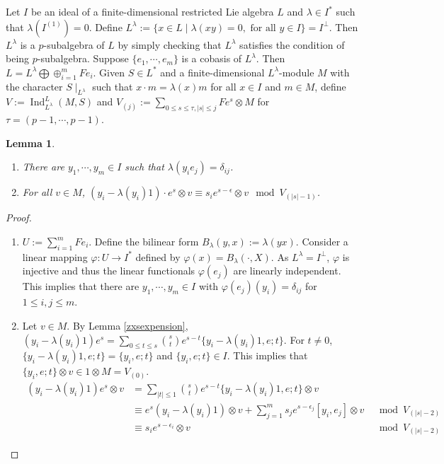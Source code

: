 \documentclass[12pt,MSc]{muthesis_2023}
\theoremstyle{plain}%
\newtheorem{Lemma}[FactCounter]{Lemma} %
\theoremstyle{definition}
\theoremstyle{remark}
\DeclareMathOperator{\Ind}{Ind}
\begin{document}
Let $I$ be an ideal of a finite-dimensional restricted Lie algebra $L$ and $\lambda\in I^*$ such that $\lambda(I^{(1)})=0$. Define $L^{\lambda}:= \{x\in L \mid \lambda(xy)=0, \text{ for all } y\in I\}=I^{\perp}$. Then $L^{\lambda}$ is a $p$-subalgebra of $L$ by simply checking that $L^{\lambda}$ satisfies the condition of being $p$-subalgebra. Suppose $\{e_1,\cdots, e_m\}$ is a cobasis of $L^{\lambda}$. Then $L=L^{\lambda}\bigoplus \oplus_{i=1}^m Fe_i$. Given $S\in L^*$ and a finite-dimensional $L^{\lambda}$-module $M$ with the character $S\mid_{L^{\lambda}}$ such that $x\cdot m= \lambda(x)m$ for all $x\in I$ and $m\in M$, define $V:=\Ind^L_{L^{\lambda}}(M,S)$ and $V_{(j)}:=\sum_{0\leq s\leq \tau, |s|\leq j}Fe^s \otimes M$ for $\tau=(p-1, \cdots, p-1)$.

\begin{Lemma}\label{equationaboutyes}
\begin{enumerate}
\item[(1)]
There are $y_1,\cdots, y_m \in I$ such that $\lambda(y_ie_j)=\delta_{ij}$.

\item[(2)] For all $v\in M$, $(y_i-\lambda(y_i)1)\cdot e^s\otimes v \equiv s_i e^{s-\epsilon}\otimes v \mod V_{(|s|-1)}$.
\end{enumerate}
\end{Lemma}

\begin{proof}
\begin{enumerate}
\item[(1)] $U:=\sum_{i=1}^m Fe_i$. Define the bilinear form $B_{\lambda}(y,x):= \lambda(yx)$. Consider a linear mapping $\varphi: U \rightarrow I^*$ defined by $\varphi(x)=B_{\lambda}(\cdot, X)$. As $L^{\lambda}=I^{\perp}$, $\varphi$ is injective and thus the linear functionals $\varphi(e_j)$ are linearly independent. This implies that there are $y_1,\cdots, y_m\in I$ with $\varphi(e_j)(y_i)=\delta_{ij}$ for $1\leq i,j \leq m$.

\item[(2)]
Let $v\in M$. By Lemma \ref{zxsexpension}, $(y_i-\lambda(y_i)1)e^s=\sum_{0\leq t\leq s}\binom{s}{t}e^{s-t}\{y_i-\lambda(y_i)1, e; t\}$. For $t\neq 0$, $\{y_i-\lambda(y_i)1, e;t\}=\{y_i, e;t\}$ and $\{y_i, e;t\}\in I$. This implies that $\{y_i, e ; t\}\otimes v \in 1\otimes M=V_{(0)}$. 
\begin{align*}
(y_i-\lambda(y_i)1)e^s\otimes v&=\sum_{|t|\leq 1}\binom{s}{t}e^{s-t}\{y_i-\lambda(y_i)1, e; t\}\otimes v&\\
&\equiv e^s(y_i-\lambda(y_i)1)\otimes v+\sum_{j=1}^m s_je^{s-\epsilon_j}[y_i, e_j]\otimes v& \mod V_{(|s|-2)}\\
&\equiv s_ie^{s-\epsilon_i}\otimes v& \mod V_{(|s|-2)}
\end{align*}
\end{enumerate}
\end{proof}
\end{document}
